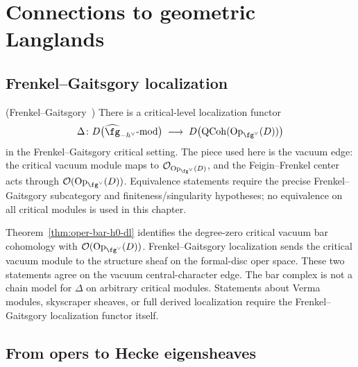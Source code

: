 \section{Connections to geometric Langlands}
\label{sec:langlands-connections}

\subsection{Frenkel--Gaitsgory localization}

\begin{theorem}
\label{thm:fg-localization}
\textup{(}Frenkel--Gaitsgory~\cite{FG06}\textup{)}\quad
There is a critical-level localization functor
\[
\Delta\colon
D\bigl(\widehat{\fg}_{-h^\vee}\text{-mod}\bigr)
\;\longrightarrow\;
D\bigl(\mathrm{QCoh}(\mathrm{Op}_{\fg^\vee}(D))\bigr)
\]
in the Frenkel--Gaitsgory critical setting. The piece used here is the
vacuum edge: the critical vacuum module maps to
$\mathcal O_{\mathrm{Op}_{\fg^\vee}(D)}$, and the Feigin--Frenkel
center acts through
$\mathcal O(\mathrm{Op}_{\fg^\vee}(D))$. Equivalence statements require
the precise Frenkel--Gaitsgory subcategory and finiteness/singularity
hypotheses; no equivalence on all critical modules is used in this
chapter.
\end{theorem}

\begin{remark}
\label{rem:bar-as-localization}
Theorem~\ref{thm:oper-bar-h0-dl} identifies the degree-zero critical
vacuum bar cohomology with
$\mathcal O(\mathrm{Op}_{\fg^\vee}(D))$. Frenkel--Gaitsgory
localization sends the critical vacuum module to the structure sheaf
on the formal-disc oper space. These two statements agree on the
vacuum central-character edge. The bar complex is not a chain model
for $\Delta$ on arbitrary critical modules. Statements about Verma
modules, skyscraper sheaves, or full derived localization require the
Frenkel--Gaitsgory localization functor itself.
\end{remark}

\subsection{From opers to Hecke eigensheaves}

